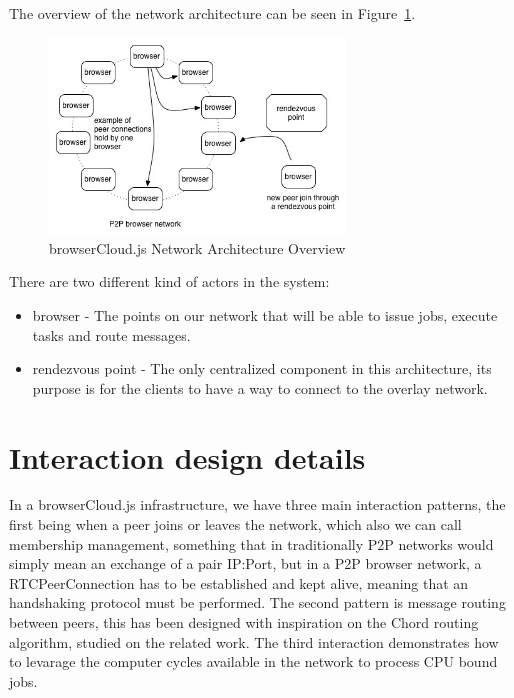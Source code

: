 The overview of the network architecture can be seen in Figure~\ref{fig:n-a-o}.

\begin{figure}[h!]
  \centering
  \includegraphics[width=0.7\textwidth]{figs/network-architecture-overview}
  \caption{browserCloud.js Network Architecture Overview}
  \label{fig:n-a-o}
\end{figure}

There are two different kind of actors in the system:

\begin{itemize}
    \item browser - The points on our network that will be able to issue jobs, execute tasks and route messages.
    \item rendezvous point - The only centralized component in this architecture, its purpose is for the clients to have a way to connect to the overlay network. 
\end{itemize}

\section{Interaction design details}

In a browserCloud.js infrastructure, we have three main interaction patterns, the first being when a peer joins or leaves the network, which also we can call membership management, something that in traditionally P2P networks would simply mean an exchange of a pair IP:Port, but in a P2P browser network, a RTCPeerConnection has to be established and kept alive, meaning that an handshaking protocol must be performed. The second pattern is message routing between peers, this has been designed with inspiration on the Chord routing algorithm, studied on the related work. The third interaction demonstrates how to levarage the computer cycles available in the network to process CPU bound jobs.

